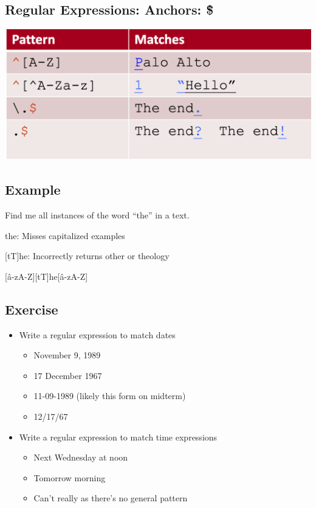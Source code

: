 \documentclass[11pt]{article}
\theoremstyle{definition}
\begin{document}
\subsection{Regular Expressions: Anchors: \^ \$}
\includegraphics[width=\textwidth]{12.png}

\subsection{Example}
Find me all instances of the word “the” in a text.

the: Misses capitalized examples

[tT]he: Incorrectly returns other or theology

[\^a-zA-Z][tT]he[\^a-zA-Z]

\subsection{Exercise}
\begin{itemize}
  \item Write a regular expression to match dates
  \begin{itemize}
    \item November 9, 1989
    \item 17 December 1967
    \item 11-09-1989 (likely this form on midterm)
    \item 12/17/67
  \end{itemize}
  \item Write a regular expression to match time expressions
  \begin{itemize}
    \item Next Wednesday at noon
    \item Tomorrow morning
    \item Can't really as there's no general pattern
  \end{itemize}
\end{itemize}
\end{document}
